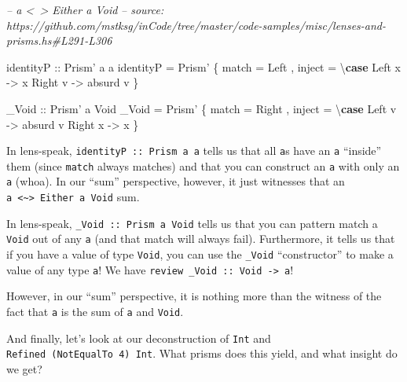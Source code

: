 \documentclass[]{article}
\newenvironment{Shaded}{}{}
\newcommand{\CommentTok}[1]{\textcolor[rgb]{0.38,0.63,0.69}{\textit{#1}}}
\newcommand{\DataTypeTok}[1]{\textcolor[rgb]{0.56,0.13,0.00}{#1}}
\newcommand{\FunctionTok}[1]{\textcolor[rgb]{0.02,0.16,0.49}{#1}}
\newcommand{\KeywordTok}[1]{\textcolor[rgb]{0.00,0.44,0.13}{\textbf{#1}}}
\newcommand{\NormalTok}[1]{#1}
\newcommand{\OtherTok}[1]{\textcolor[rgb]{0.00,0.44,0.13}{#1}}
\begin{document}
\begin{Shaded}
\begin{Highlighting}[]
\CommentTok{-- a <~> Either a Void}
\CommentTok{-- source: https://github.com/mstksg/inCode/tree/master/code-samples/misc/lenses-and-prisms.hs#L291-L306}

\OtherTok{identityP ::} \DataTypeTok{Prism'}\NormalTok{ a a}
\NormalTok{identityP }\FunctionTok{=} \DataTypeTok{Prism'}
\NormalTok{    \{ match }\FunctionTok{=} \DataTypeTok{Left}
\NormalTok{    , inject }\FunctionTok{=}\NormalTok{ \textbackslash{}}\KeywordTok{case}
        \DataTypeTok{Left}\NormalTok{  x }\OtherTok{->}\NormalTok{ x}
        \DataTypeTok{Right}\NormalTok{ v }\OtherTok{->}\NormalTok{ absurd v}
\NormalTok{    \}}

\OtherTok{_Void ::} \DataTypeTok{Prism'}\NormalTok{ a }\DataTypeTok{Void}
\NormalTok{_Void }\FunctionTok{=} \DataTypeTok{Prism'}
\NormalTok{    \{ match }\FunctionTok{=} \DataTypeTok{Right}
\NormalTok{    , inject }\FunctionTok{=}\NormalTok{ \textbackslash{}}\KeywordTok{case}
        \DataTypeTok{Left}\NormalTok{  v }\OtherTok{->}\NormalTok{ absurd v}
        \DataTypeTok{Right}\NormalTok{ x }\OtherTok{->}\NormalTok{ x}
\NormalTok{    \}}
\end{Highlighting}
\end{Shaded}

In lens-speak, \texttt{identityP\ ::\ Prism\textquotesingle{}\ a\ a} tells us
that all \texttt{a}s have an \texttt{a} ``inside'' them (since \texttt{match}
always matches) and that you can construct an \texttt{a} with only an \texttt{a}
(whoa). In our ``sum'' perspective, however, it just witnesses that an
\texttt{a\ \textless{}\textasciitilde{}\textgreater{}\ Either\ a\ Void} sum.

In lens-speak, \texttt{\_Void\ ::\ Prism\textquotesingle{}\ a\ Void} tells us
that you can pattern match a \texttt{Void} out of any \texttt{a} (and that match
will always fail). Furthermore, it tells us that if you have a value of type
\texttt{Void}, you can use the \texttt{\_Void} ``constructor'' to make a value
of any type \texttt{a}! We have
\texttt{review\ \_Void\ ::\ Void\ -\textgreater{}\ a}!

However, in our ``sum'' perspective, it is nothing more than the witness of the
fact that \texttt{a} is the sum of \texttt{a} and \texttt{Void}.

And finally, let's look at our deconstruction of \texttt{Int} and
\texttt{Refined\ (NotEqualTo\ 4)\ Int}. What prisms does this yield, and what
insight do we get?
\end{document}
